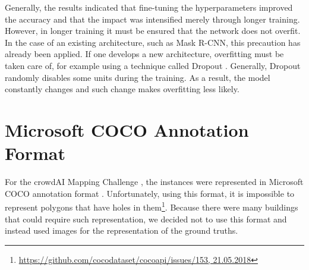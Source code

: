 Generally, the results indicated that fine-tuning the hyperparameters improved the accuracy and that the impact was intensified merely through longer training. However, in longer training it must be ensured that the network does not overfit. In the case of an existing architecture, such as Mask R-CNN, this precaution has already been applied. If one develops a new architecture, overfitting must be taken care of, for example using a technique called Dropout \cite{Srivastava.2014}. Generally, Dropout randomly disables some units during the training. As a result, the model constantly changes and such change makes overfitting less likely.

\section{Microsoft COCO Annotation Format}
For the crowdAI Mapping Challenge \cite{mappingchallenge}, the instances were represented in Microsoft COCO annotation format \cite{cocoformat}. Unfortunately, using this format, it is impossible to represent polygons that have holes in them\footnote{\url{https://github.com/cocodataset/cocoapi/issues/153, 21.05.2018}}. Because there were many buildings that could require such representation, we decided not to use this format and instead used images for the representation of the ground truths.

